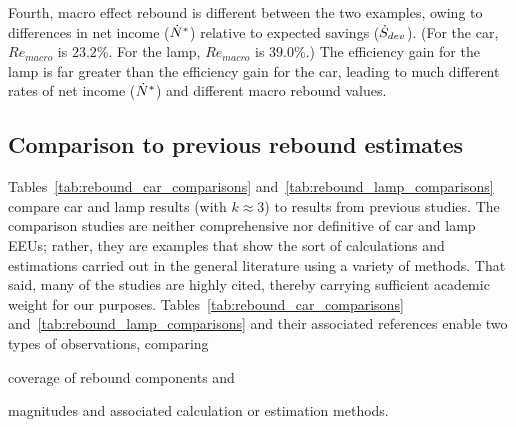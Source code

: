 \documentclass[12pt]{article}\usepackage[]{graphicx}\usepackage[]{xcolor}
\begin{document}
Fourth,
macro effect rebound is different between the two examples, 
owing to differences in net income (${\dot{N}}^*$) relative to expected savings ($\dot{S}_{dev}$).
(For the car, $Re_{macro}$ is $23.2$\%.
For the lamp, $Re_{macro}$ is $39.0$\%.)
The efficiency gain for the lamp is far greater than the efficiency gain for the car,
leading to much different rates of net income (${\dot{N}}^*$) and
different macro rebound values.



\subsection{Comparison to previous rebound estimates} 
\label{sec:comparison_to_other_rebound_estimates}

Tables~\ref{tab:rebound_car_comparisons} and~\ref{tab:rebound_lamp_comparisons}
compare car and lamp results (with $k \approx 3$) to 
results from previous studies.
The comparison studies are neither comprehensive nor
definitive of car and lamp EEUs; 
rather, they are examples that show the sort of calculations and estimations
carried out in the general literature using a variety of methods. 
That said, many of the studies are highly cited,
thereby carrying sufficient academic weight for our purposes.
Tables~\ref{tab:rebound_car_comparisons} and~\ref{tab:rebound_lamp_comparisons}
and their associated references 
enable two types of observations, comparing
%
\begin{enumerate*}[label={(\roman*)}]
	
  \item coverage of rebound components and
  
  \item magnitudes and associated calculation or estimation methods.
    
\end{enumerate*}
\end{document}
